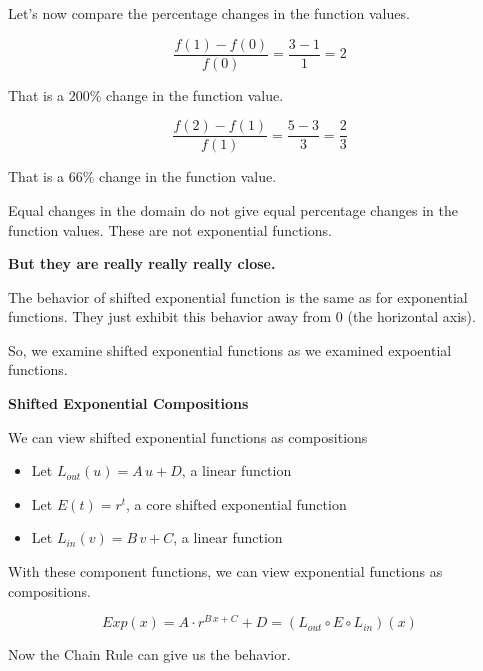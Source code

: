 \documentclass{ximera}
\begin{document}
Let's now compare the percentage changes in the function values. 



\[
\frac{f(1) - f(0)}{f(0)} = \frac{3 - 1}{1} = 2
\]

That is a $200\%$ change in the function value. 





\[
\frac{f(2) - f(1)}{f(1)} = \frac{5 - 3}{3} = \frac{2}{3}
\]

That is a $66\%$ change in the function value. 




Equal changes in the domain do not give equal percentage changes in the function values.   These are not exponential functions.


\begin{center}
\textbf{But they are really really really close.} 
\end{center}


The behavior of shifted exponential function is the same as for exponential functions.  They just exhibit this behavior away from $0$ (the horizontal axis).


So, we examine shifted exponential functions as we examined expoential functions.




\begin{idea}  \textbf{\textcolor{blue!55!black}{Shifted Exponential Compositions}} 

We can view shifted exponential functions as compositions


\begin{itemize}
\item Let $L_{out}(u) = A \, u + D$, a linear function
\item Let $E(t) = r^t$, a core shifted exponential function
\item Let $L_{in}(v) = B \, v + C$, a linear function
\end{itemize}

With these component functions, we can view exponential functions as compositions.


\[  Exp(x) =    A \cdot r^{B \, x + C} + D = (L_{out} \circ E \circ L_{in})(x) \]


Now the Chain Rule can give us the behavior.

\end{idea}
\end{document}
